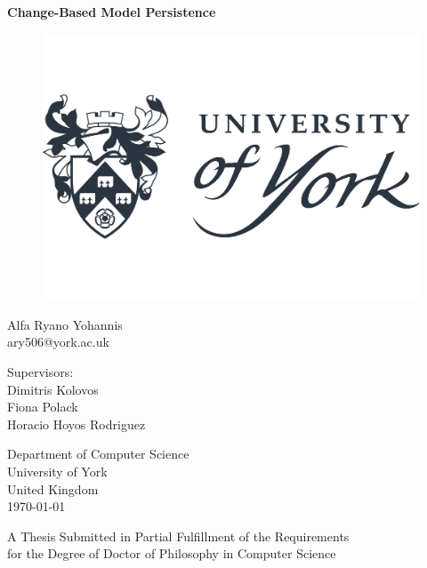 \documentclass[12pt, a4paper]{report} \usepackage[titletoc]{appendix}
\begin{document}
\begin{titlepage}
\begin{center}

\textbf{\large Change-Based Model Persistence}

\vfill
\begin{figure}[ht]
\centering
\includegraphics[width=0.5\linewidth]{uoy}
\label{fig:uoy}
\end{figure}
\vfill

Alfa Ryano Yohannis\\
ary506@york.ac.uk

\vspace{1cm}

Supervisors:\\
Dimitris Kolovos\\
Fiona Polack\\
Horacio Hoyos Rodriguez
\vspace{1cm}

Department of Computer Science\\
University of York\\
United Kingdom\\
\vspace{1cm}
\today

\vfill
A Thesis Submitted in Partial Fulfillment of the Requirements\\
for the Degree of Doctor of Philosophy in Computer Science


\end{center}
\end{titlepage}
\end{document}
